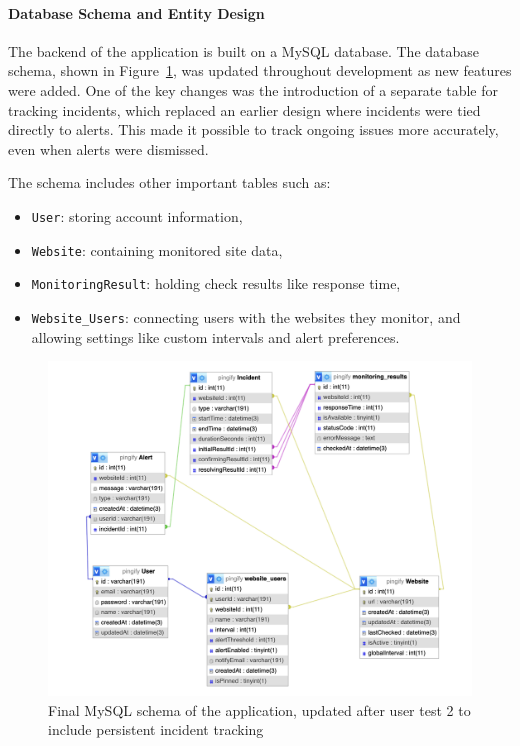 \paragraph{Database Schema and Entity Design}

The backend of the application is built on a MySQL database. The database schema, shown in Figure~\ref{fig:er_schema_results}, was updated throughout development as new features were added. One of the key changes was the introduction of a separate table for tracking incidents, which replaced an earlier design where incidents were tied directly to alerts. This made it possible to track ongoing issues more accurately, even when alerts were dismissed.

The schema includes other important tables such as:
\begin{itemize}
    \item \texttt{User}: storing account information,
    \item \texttt{Website}: containing monitored site data,
    \item \texttt{MonitoringResult}: holding check results like response time,
    \item \texttt{Website\_Users}: connecting users with the websites they monitor, and allowing settings like custom intervals and alert preferences.
\end{itemize}

\begin{figure}[H]
\centering
\includegraphics[width=0.85\linewidth]{figures/diagrams/mysql_scheme.png}
\caption{Final MySQL schema of the application, updated after user test 2 to include persistent incident tracking}
\label{fig:er_schema_results}
\end{figure}

